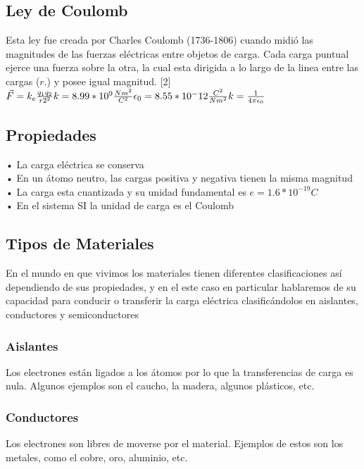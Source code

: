 \documentclass[14pt]{article}
\begin{document}
	\subsection{Ley de Coulomb}
	Esta ley fue creada por Charles Coulomb (1736-1806) cuando midió las magnitudes de las fuerzas eléctricas entre objetos de carga. Cada carga puntual ejerce una fuerza sobre la otra, la cual esta dirigida a lo largo de la linea entre las cargas ($r.$) y posee igual magnitud. [2]\\
	\begin{math}
		 \vec{F} = k_{e} \frac{q_{1}q_{2}}{r{2^2}} \\  
		 k = 8.99*10^9 \frac{Nm^2}{C^2} \\
		 \epsilon_{0} = 8.55*10^-12 \frac{C^2}{Nm^2} \\
		 k = \frac{1}{4 \pi \epsilon_{0}} \\
	\end{math}
	
		\subsection{Propiedades}
		• La carga eléctrica se conserva \\
		• En un átomo neutro, las cargas 
		positiva y negativa tienen la misma
		magnitud \\
		• La carga esta cuantizada y su
		unidad fundamental es
		$e = 1.6*10^{-19}C$ \\
		• En el sistema SI la unidad de
		carga es el Coulomb \\
	\subsection{Tipos de Materiales}
	En el mundo en que vivimos los materiales tienen diferentes clasificaciones así dependiendo de sus propiedades, y en el este caso en particular hablaremos de su capacidad para conducir o transferir la carga eléctrica clasificándolos en aislantes, conductores y semiconductores 
	\subsubsection{Aislantes}
	Los electrones están ligados a los átomos por lo que la transferencias de carga es nula. Algunos ejemplos son el caucho, la madera, algunos plásticos, etc. 
	\subsubsection{Conductores}
	Los electrones son libres de moverse por el material. Ejemplos de estos son los metales, como el cobre, oro, aluminio, etc.
\end{document}
